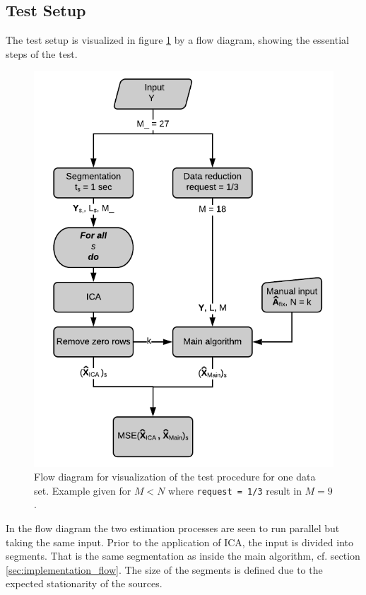 \subsection{Test Setup}
The test setup is visualized in figure \ref{fig:flow2} by a flow diagram, showing the essential steps of the test. 
\begin{figure}[H]
    \centering
	\includegraphics[scale=1]{figures/ch_7/flow2.png}
	\caption{Flow diagram for visualization of the test procedure for one data set. Example given for $M < N$ where \texttt{request = 1/3} result in $M = 9$.}
	\label{fig:flow2}
\end{figure}
\noindent
In the flow diagram the two estimation processes are seen to run parallel but taking the same input. 
Prior to the application of ICA, the input is divided into segments. 
That is the same segmentation as inside the main algorithm, cf. section \ref{sec:implementation_flow}.
The size of the segments is defined due to the expected stationarity of the sources. 
